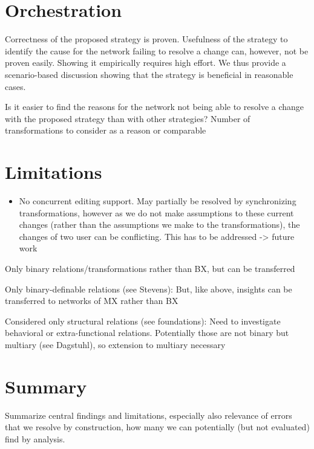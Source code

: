 \section{Orchestration}

Correctness of the proposed strategy is proven.
Usefulness of the strategy to identify the cause for the network failing to resolve a change can, however, not be proven easily.
Showing it empirically requires high effort.
We thus provide a scenario-based discussion showing that the strategy is beneficial in reasonable cases.

{Is it easier to find the reasons for the network not being able to resolve a change with the proposed strategy than with other strategies?}
{Number of transformations to consider as a reason or comparable}




\section{Limitations}

\begin{itemize}
    \item No concurrent editing support. May partially be resolved by synchronizing transformations, however as we do not make assumptions to these current changes (rather than the assumptions we make to the transformations), the changes of two user can be conflicting. This has to be addressed -> future work
\end{itemize}

Only binary relations/transformations rather than BX, but can be transferred

Only binary-definable relations (see Stevens): But, like above, insights can be transferred to networks of MX rather than BX

Considered only structural relations (see foundations): Need to investigate behavioral or extra-functional relations. Potentially those are not binary but multiary (see Dagstuhl), so extension to multiary necessary



\section{Summary}

Summarize central findings and limitations, especially also relevance of errors that we resolve by construction, how many we can potentially (but not evaluated) find by analysis.